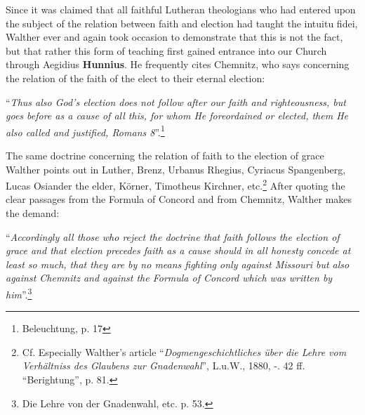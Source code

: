                 Since it was claimed that all faithful Lutheran theologians who had entered upon the subject of the relation between faith and election had taught the intuitu fidei, Walther ever and again took occasion to demonstrate that this is not the fact, but that rather this form of teaching first gained entrance into our Church through Aegidius \textbf{Hunnius}.  He frequently cites Chemnitz, who says concerning the relation of the faith of the elect to their eternal election: \begin{displayquote}“\textit{Thus also God’s election does not follow after our faith and righteousness, but goes before as a cause of all this, for whom He foreordained or elected, them He also called and justified, Romans 8}”.\footnote{Beleuchtung, p. 17}\end{displayquote}  The same doctrine concerning the relation of faith to the election of grace Walther points out in Luther, Brenz, Urbanus Rhegius, Cyriacus Spangenberg, Lucas Osiander the elder, Körner, Timotheus Kirchner, etc.\footnote{Cf. Especially Walther’s article “\textit{Dogmengeschichtliches über die Lehre vom Verhältniss des Glaubens zur Gnadenwahl}”, L.u.W., 1880, -. 42 ff. “Berightung”, p. 81.}  After quoting the clear passages from the Formula of Concord and from Chemnitz, Walther makes the demand: \begin{displayquote}“\textit{Accordingly all those who reject the doctrine that faith follows the election of grace and that election precedes faith as a cause should in all honesty concede at least so much, that they are by no means fighting only against Missouri but also against Chemnitz and against the Formula of Concord which was written by him}”.\footnote{Die Lehre von der Gnadenwahl, etc. p. 53.}\end{displayquote}

